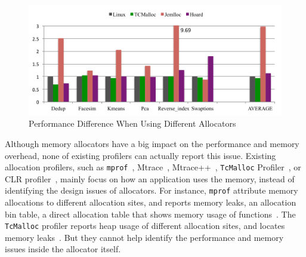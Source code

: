 

\begin{figure}[!ht]
\centering
\includegraphics[width=5in]{figures/motivation}
\caption{Performance Difference When Using Different Allocators\label{fig:motivation}}
\end{figure}


Although memory allocators have a big impact on the performance and memory overhead, none of existing profilers can actually report this issue. Existing allocation profilers, such as \texttt{mprof}~\citep{Zorn:1988:MAP:894814}, Mtrace~\citep{mtrace}, Mtrace++~\citep{Lee:2000:DMM:786772.787150}, \texttt{TcMalloc} Profiler~\citep{tcmalloc-profiler}, or CLR profiler~\citep{lupasc2014dynamic}, mainly focus on how an application uses the memory, instead of identifying the design issues of allocators. For instance, \texttt{mprof} attribute memory allocations to different allocation sites, and reports memory leaks, an allocation bin table, a direct allocation table that shows memory usage of functions~\citep{Zorn:1988:MAP:894814}. The \texttt{TcMalloc} profiler reports heap usage of different allocation sites, and locates memory leaks~\citep{tcmalloc-profiler}. But they cannot help identify the performance and memory issues inside the allocator itself. 


